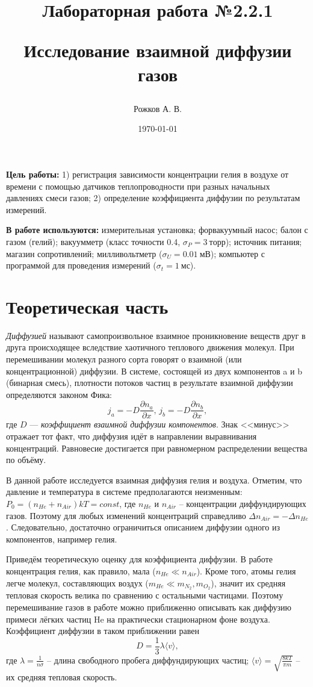 \documentclass[a4paper, 12pt]{article}
\title{\begin{center}Лабораторная работа №2.2.1\end{center}
Исследование взаимной диффузии газов}
\author{Рожков А. В.}
\date{\today}
\begin{document}
    \maketitle
    \newpage

    \textbf{Цель работы:} 1) регистрация зависимости концентрации гелия в воздухе от времени с помощью датчиков теплопроводности при разных начальных давлениях смеси газов; 2) определение коэффициента диффузии по результатам измерений.

    \textbf{В работе используются:} измерительная установка; форвакуумный насос; балон с газом  (гелий); вакуумметр (класс точности 0.4, $\sigma_P = 3~торр$); источник питания; магазин сопротивлений; милливольтметр ($\sigma_U = 0.01~мВ$); компьютер с программой для проведения измерений ($\sigma_t = 1~мс$).


    \section{Теоретическая часть}
        \textit{Диффузией}  называют самопроизвольное взаимное проникновение веществ друг в друга происходящее вследствие хаотичного теплового движения молекул. При перемешивании молекул разного сорта говорят о взаимной (или концентрационной) диффузии. В системе, состоящей из двух компонентов a и b (бинарная смесь), плотности потоков частиц в результате взаимной диффузии определяются законом Фика:
        \begin{equation}
            j_a = -D \frac{\partial n_a}{\partial x}, \, j_b = -D \frac{\partial n_b}{\partial x},
        \end{equation}
        где $D$ — \textit{коэффициент взаимной диффузии компонентов}. Знак <<минус>> отражает тот факт, что диффузия идёт в направлении выравнивания концентраций. Равновесие достигается при равномерном распределении вещества по объёму.

        В данной работе исследуется взаимная диффузия гелия и воздуха. Отметим, что давление и температура в системе предполагаются неизменным: $P_0 = (n_{He}+n_{Air})kT = const$, где $n_{He}$  и $n_{Air}$ -- концентрации диффундирующих газов. Поэтому для любых изменений концентраций справедливо $\Delta n_{Air} = -\Delta n_{He}$. Следовательно, достаточно ограничиться описанием диффузии одного из компонентов, например гелия.

        Приведём теоретическую оценку для коэффициента диффузии. В работе концентрация гелия, как правило, мала ($n_{He} \ll n_{Air}$). Кроме того, атомы гелия легче молекул, составляющих воздух ($m_{He} \ll m_{N_2}, m_{O_2}$), значит их средняя тепловая скорость велика по сравнению с остальными частицами. Поэтому перемешивание газов в работе можно приближенно описывать как диффузию примеси лёгких частиц He на практически стационарном фоне воздуха. Коэффициент диффузии в таком приближении равен
        \begin{equation}
            \label{D}
            D = \frac{1}{3} \lambda \langle v \rangle,
        \end{equation}
        где $\lambda = \frac{1}{n\sigma}$ -- длина свободного пробега диффундирующих частиц; $\langle v \rangle = \sqrt{\frac{8kT}{\pi m}}$ -- их средняя тепловая скорость.
\end{document}
